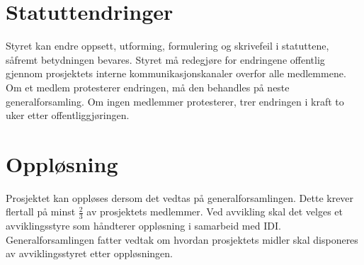 \section{Statuttendringer}\label{sec:statuttendringer}
Styret kan endre oppsett, utforming, formulering og skrivefeil i statuttene, såfremt betydningen bevares.
Styret må redegjøre for endringene offentlig gjennom prosjektets interne kommunikasjonskanaler overfor alle medlemmene.
Om et medlem protesterer endringen, må den behandles på neste generalforsamling.
Om ingen medlemmer protesterer, trer endringen i kraft to uker etter offentliggjøringen.


\section{Oppløsning}\label{sec:oppløsning}
Prosjektet kan oppløses dersom det vedtas på generalforsamlingen.
Dette krever flertall på minst $\frac{2}{3}$ av prosjektets medlemmer.
Ved avvikling skal det velges et avviklingsstyre som håndterer oppløsning i samarbeid med IDI.\@
Generalforsamlingen fatter vedtak om hvordan prosjektets midler skal disponeres av avviklingsstyret etter oppløsningen.
